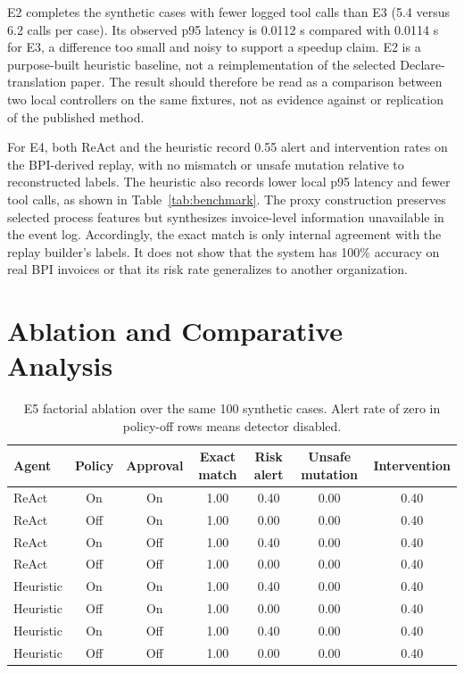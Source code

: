 \documentclass[conference]{IEEEtran}
\begin{document}
E2 completes the synthetic cases with fewer logged tool calls than E3 (5.4 versus 6.2 calls per case). Its observed p95 latency is 0.0112 s compared with 0.0114 s for E3, a difference too small and noisy to support a speedup claim. E2 is a purpose-built heuristic baseline, not a reimplementation of the selected Declare-translation paper. The result should therefore be read as a comparison between two local controllers on the same fixtures, not as evidence against or replication of the published method.

For E4, both ReAct and the heuristic record 0.55 alert and intervention rates on the BPI-derived replay, with no mismatch or unsafe mutation relative to reconstructed labels. The heuristic also records lower local p95 latency and fewer tool calls, as shown in Table~\ref{tab:benchmark}. The proxy construction preserves selected process features but synthesizes invoice-level information unavailable in the event log. Accordingly, the exact match is only internal agreement with the replay builder's labels. It does not show that the system has 100\% accuracy on real BPI invoices or that its risk rate generalizes to another organization.

\section{Ablation and Comparative Analysis}

\begin{table}[t]
\centering
\caption{E5 factorial ablation over the same 100 synthetic cases. Alert rate of zero in policy-off rows means detector disabled.}
\label{tab:ablation}
\begin{tabular}{lcccccc}
\toprule
Agent & Policy & Approval & Exact match & Risk alert & Unsafe mutation & Intervention \\
\midrule
ReAct & On & On & 1.00 & 0.40 & 0.00 & 0.40 \\
ReAct & Off & On & 1.00 & 0.00 & 0.00 & 0.40 \\
ReAct & On & Off & 1.00 & 0.40 & 0.00 & 0.40 \\
ReAct & Off & Off & 1.00 & 0.00 & 0.00 & 0.40 \\
Heuristic & On & On & 1.00 & 0.40 & 0.00 & 0.40 \\
Heuristic & Off & On & 1.00 & 0.00 & 0.00 & 0.40 \\
Heuristic & On & Off & 1.00 & 0.40 & 0.00 & 0.40 \\
Heuristic & Off & Off & 1.00 & 0.00 & 0.00 & 0.40 \\
\bottomrule
\end{tabular}
\end{table}
\end{document}
